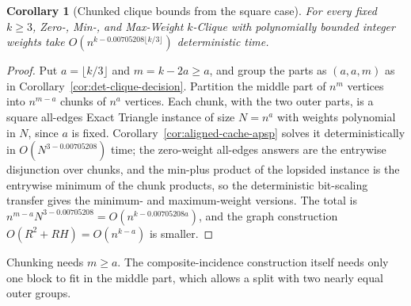 \documentclass[11pt]{article}
\newtheorem{corollary}[theorem]{Corollary}
\begin{document}
\begin{corollary}[Chunked clique bounds from the square case]
\label{cor:chunked-clique}
For every fixed $k\ge3$, Zero-, Min-, and Max-Weight $k$-Clique with
polynomially bounded integer weights take
$O(n^{k-0.00705208\lfloor k/3\rfloor})$ deterministic time.
\end{corollary}
\begin{proof}
Put $a=\lfloor k/3\rfloor$ and $m=k-2a\ge a$, and group the parts as
$(a,a,m)$ as in Corollary~\ref{cor:det-clique-decision}. Partition the
middle part of $n^m$ vertices into $n^{m-a}$ chunks of $n^a$ vertices.
Each chunk, with the two outer parts, is a square all-edges Exact Triangle
instance of size $N=n^a$ with weights polynomial in $N$, since $a$ is
fixed. Corollary~\ref{cor:aligned-cache-apsp} solves it deterministically in
$O(N^{3-0.00705208})$ time; the zero-weight all-edges answers are the
entrywise disjunction over chunks, and the min-plus product of the
lopsided instance is the entrywise minimum of the chunk products, so the
deterministic bit-scaling transfer gives the minimum- and maximum-weight
versions. The total is
$n^{m-a}N^{3-0.00705208}=O(n^{k-0.00705208a})$, and the graph construction
$O(R^2+RH)=O(n^{k-a})$ is smaller.
\end{proof}
Chunking needs $m\ge a$. The composite-incidence construction itself
needs only one block to fit in the middle part, which allows a split with
two nearly equal outer groups.
\end{document}
